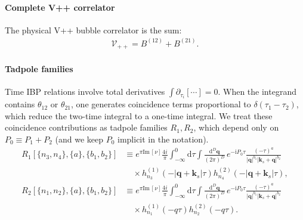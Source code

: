 \documentclass[a4paper,12pt]{article}
\newcommand{\FR}[2]{\displaystyle\frac{\,{#1}\,}{#2}}
\def\di{{\mathrm{d}}}
\def\mb{\mathbf}
\def\pd{\partial}
\def\ii{\mathrm{i}}
\def\Im{\mathrm{Im}\,}
\begin{document}
\paragraph{Complete V++ correlator}
The physical V++ bubble correlator is the sum:
\begin{align}
	\mathcal{V}_{++} = B^{(12)} + B^{(21)}.
\end{align}

\paragraph{Tadpole families} Time IBP relations involve total derivatives $\int \pd_{\tau_i}[\cdots]=0$. When the integrand contains $\theta_{12}$ or $\theta_{21}$, one generates coincidence terms proportional to $\delta(\tau_1-\tau_2)$, which reduce the two-time integral to a one-time integral. We treat these coincidence contributions as tadpole families $R_1,R_2$, which depend only on $P_0\equiv P_1+P_2$ (and we keep $P_0$ implicit in the notation).
\begin{align}
	R_1[\{n_3,n_4\},\{a\},\{b_1,b_2\}] & \equiv e^{\pi \Im [\nu]}\frac{4i}{\pi}\int_{-\infty}^0 \di\tau \int \FR{\di^D \mb q}{(2\pi)^D}\, e^{-\ii P_0\tau} \frac{(-\tau)^{a}}{|\mb q|^{b_1}|\mb k_s+\mb q|^{b_2}} \nonumber \\
	                                        & \quad\times h_{n_3}^{(1)}(-|\mb q+\mb k_s|\tau)h_{n_4}^{(2)}(-|\mb q+\mb k_s|\tau),                                                                                                                 \\
	R_2[\{n_1,n_2\},\{a\},\{b_1,b_2\}] & \equiv e^{\pi \Im [\nu]}\frac{4i}{\pi}\int_{-\infty}^0 \di\tau \int \FR{\di^D \mb q}{(2\pi)^D}\, e^{-\ii P_0\tau} \frac{(-\tau)^{a}}{|\mb q|^{b_1}|\mb k_s+\mb q|^{b_2}} \nonumber \\
	                                        & \quad\times h_{n_1}^{(1)}(-q\tau)h_{n_2}^{(2)}(-q\tau).
\end{align}
\end{document}
